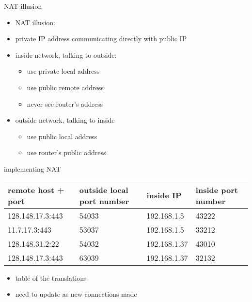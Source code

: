 \begin{frame}{NAT illusion}
    \begin{itemize}
    \item NAT illusion:
    \item private IP address communicating directly with public IP
    \vspace{.5cm}
    \item inside network, talking to outside:
        \begin{itemize}
        \item use private local address
        \item use public remote address
        \item never see router's address
        \end{itemize}
    \item outside network, talking to inside
        \begin{itemize}
        \item use public local address
        \item use router's public address
        \end{itemize}
    \end{itemize}
\end{frame}

\begin{frame}{implementing NAT}
\small
\begin{tabular}{llll}
remote host + port & outside local port number & inside IP & inside port number \\ \hline
128.148.17.3:443 & 54033 & 192.168.1.5 & 43222 \\
11.7.17.3:443 & 53037 & 192.168.1.5 & 33212 \\
128.148.31.2:22 & 54032 & 192.168.1.37 & 43010 \\
128.148.17.3:443 & 63039 & 192.168.1.37 & 32132 \\
\end{tabular}
\begin{itemize}
\item table of the translations
\item need to update as new connections made
\end{itemize}
\end{frame}
